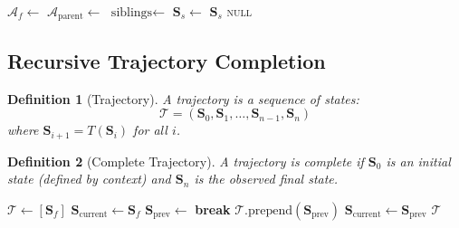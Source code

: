 \documentclass[twocolumn,10pt]{article}
\newtheorem{definition}{Definition}
\begin{document}
\begin{algorithm}
\caption{Find Penultimate State}
\begin{algorithmic}[1]
    \State $\mathcal{A}_f \gets$ 
    \State $\mathcal{A}_{\text{parent}} \gets$ 
    \State $\text{siblings} \gets$ 
        \State $\mathbf{S}_s \gets$ 
            \State \Return $\mathbf{S}_s$
        \EndIf
    \EndFor
    \State \Return \textsc{null}
\EndProcedure
\end{algorithmic}
\end{algorithm}

\subsection{Recursive Trajectory Completion}

\begin{definition}[Trajectory]
A trajectory is a sequence of states:
\begin{equation}
\mathcal{T} = (\mathbf{S}_0, \mathbf{S}_1, \ldots, \mathbf{S}_{n-1}, \mathbf{S}_n)
\end{equation}
where $\mathbf{S}_{i+1} = T(\mathbf{S}_i)$ for all $i$.
\end{definition}

\begin{definition}[Complete Trajectory]
A trajectory is complete if $\mathbf{S}_0$ is an initial state (defined by context) and $\mathbf{S}_n$ is the observed final state.
\end{definition}

\begin{algorithm}
\caption{Complete Trajectory}
\begin{algorithmic}[1]
    \State $\mathcal{T} \gets [\mathbf{S}_f]$
    \State $\mathbf{S}_{\text{current}} \gets \mathbf{S}_f$
        \State $\mathbf{S}_{\text{prev}} \gets$ 
            \State \textbf{break}
        \EndIf
        \State $\mathcal{T}.\text{prepend}(\mathbf{S}_{\text{prev}})$
        \State $\mathbf{S}_{\text{current}} \gets \mathbf{S}_{\text{prev}}$
    \EndWhile
    \State \Return $\mathcal{T}$
\EndProcedure
\end{algorithmic}
\end{algorithm}
\end{document}
